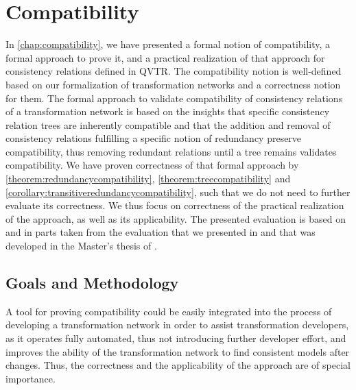 \section{Compatibility}
\label{chap:correctness_evaluation:compatibility}

In \autoref{chap:compatibility}, we have presented a formal notion of compatibility, a formal approach to prove it, and a practical realization of that approach for consistency relations defined in \gls{QVTR}.
The compatibility notion is well-defined based on our formalization of transformation networks and a correctness notion for them.
The formal approach to validate compatibility of consistency relations of a transformation network is based on the insights that specific consistency relation trees are inherently compatible and that the addition and removal of consistency relations fulfilling a specific notion of redundancy preserve compatibility, thus removing redundant relations until a tree remains validates compatibility.
We have proven correctness of that formal approach by \autoref{theorem:redundancycompatibility}, \autoref{theorem:treecompatibility} and \autoref{corollary:transitiveredundancycompatibility}, such that we do not need to further evaluate its correctness.
We thus focus on correctness of the practical realization of the approach, as well as its applicability.
The presented evaluation is based on and in parts taken from the evaluation that we presented in  and that was developed in the Master's thesis of \textcite{pepin2019ma}.


\subsection{Goals and Methodology}

A tool for proving compatibility could be easily integrated into the process of developing a transformation network in order to assist transformation developers, as it operates fully automated, thus not introducing further developer effort, and improves the ability of the transformation network to find consistent models after changes.
Thus, the correctness and the applicability of the approach are of special importance.

